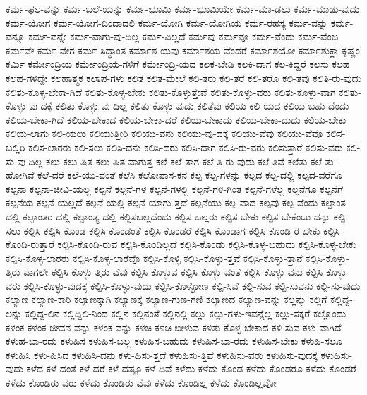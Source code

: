 {ಕರ್ಮ-ಫಲ-ವನ್ನು
ಕರ್ಮ-ಬಲೆ-ಯನ್ನು
ಕರ್ಮ-ಭೂಮಿ
ಕರ್ಮ-ಭೂಮಿಯೇ
ಕರ್ಮ-ಮಾ-ಡಲು
ಕರ್ಮ-ಮಾಡು-ವುದು
ಕರ್ಮ-ಯೋಗ
ಕರ್ಮ-ಯೋಗ-ದಿಂದಾದಲಿ
ಕರ್ಮ-ಯೋಗಿ
ಕರ್ಮ-ಯೋಗಿಯ
ಕರ್ಮ-ರಹಸ್ಯ
ಕರ್ಮ-ವನ್ನು
ಕರ್ಮ-ವನ್ನೂ
ಕರ್ಮ-ವನ್ನೇ
ಕರ್ಮ-ವಾಗು-ವು-ದಿಲ್ಲ
ಕರ್ಮ-ವಿಲ್ಲದೆ
ಕರ್ಮವು
ಕರ್ಮವೂ
ಕರ್ಮ-ವೆಂದು
ಕರ್ಮ-ವೆಂಬ
ಕರ್ಮವೇ
ಕರ್ಮ-ವೇಗ
ಕರ್ಮ-ಸಿದ್ಧಾಂತ
ಕರ್ಮಾಶ-ಯವು
ಕರ್ಮಾಶಯ-ವೆಂದರೆ
ಕರ್ಮಾಶಯೋ
ಕರ್ಮಾಶುಕ್ಲಾ-ಕೃಷ್ಣಂ
ಕರ್ಮಿ
ಕರ್ಮೇಂದ್ರಿಯ
ಕರ್ಮೇಂದ್ರಿಯ-ಗಳಿಗೆ
ಕರ್ಮೇಂದ್ರಿ-ಯದ
ಕಲಕ-ಬೇಡಿ
ಕಲಕಿ-ದಾಗ
ಕಲ-ಕಿದ್ದರೆ
ಕಲಸು
ಕಲಹ
ಕಲಹ-ಗಳಿದ್ದೇ
ಕಲಹಾತ್ಮಕ
ಕಲಾಪ-ಗಳು
ಕಲಿತ
ಕಲಿತ-ಮೇಲೆ
ಕಲಿ-ತರು
ಕಲಿ-ತರೆ
ಕಲಿ-ತರೊ
ಕಲಿ-ತವು
ಕಲಿತಿ-ರು-ವುದು
ಕಲಿತು-ಕೊಳ್ಳ-ಬೇಕಾ-ಗಿದೆ
ಕಲಿತು-ಕೊಳ್ಳ-ಬೇಕು
ಕಲಿತು-ಕೊಳ್ಳುತ್ತೇವೆ
ಕಲಿತು-ಕೊಳ್ಳು-ವರು
ಕಲಿತು-ಕೊಳ್ಳು-ವಾಗ
ಕಲಿತು-ಕೊಳ್ಳು-ವು-ದಕ್ಕೆ
ಕಲಿತು-ಕೊಳ್ಳು-ವು-ದಿಲ್ಲ
ಕಲಿತು-ಕೊಳ್ಳು-ವುದು
ಕಲಿತೆವು
ಕಲಿಯ
ಕಲಿ-ಯದ
ಕಲಿಯ-ಬಹು-ದೆಂದು
ಕಲಿಯ-ಬೇಕಾ-ಗಿದೆ
ಕಲಿಯ-ಬೇಕಾದ
ಕಲಿಯ-ಬೇಕಾ-ದರೆ
ಕಲಿಯ-ಬೇಕಾದು
ಕಲಿಯ-ಬೇಕಾ-ದುದು
ಕಲಿಯ-ಬೇಕು
ಕಲಿಯ-ಲಾಗು
ಕಲಿ-ಯಲು
ಕಲಿಯುತ್ತೀರಿ
ಕಲಿಯು-ವನು
ಕಲಿಯು-ವು-ದಕ್ಕೆ
ಕಲಿಯು-ವೆವು
ಕಲಿಯು-ವೆವೊ
ಕಲಿಸ-ಬಲ್ಲಿರಿ
ಕಲಿಸ-ಲಾರರು
ಕಲಿ-ಸಲು
ಕಲಿಸಿ-ದನು
ಕಲಿಸಿ-ದರು
ಕಲಿಸಿ-ದಾಗ
ಕಲಿಸಿ-ರು-ವರು
ಕಲಿಸುತ್ತಾರೆ
ಕಲಿಸು-ವರು
ಕಲಿ-ಸು-ವು-ದಿಲ್ಲ
ಕಲು
ಕಲು-ಷಿತ
ಕಲು-ಷಿತ-ವಾಗುತ್ತ
ಕಲೆ
ಕಲೆ-ತಾಗ
ಕಲೆ-ತಿ-ರು-ವುದು
ಕಲೆ-ತಿವೆ
ಕಲೆತು
ಕಲೆ-ತು-ಹೋಗಿವೆ
ಕಲೆ-ದರೆ
ಕಲೆ-ಯು-ವಂತೆ
ಕಲೆಸಿ
ಕಲೋಪಾಸ-ಕನ
ಕಲ್ಪ
ಕಲ್ಪ-ಗಳನ್ನು
ಕಲ್ಪದ
ಕಲ್ಪ-ದಲ್ಲಿ
ಕಲ್ಪದ-ವರೆಗೂ
ಕಲ್ಪನಾ
ಕಲ್ಪನಾ-ಜೀವಿ-ಯಲ್ಲ
ಕಲ್ಪನೆ
ಕಲ್ಪನೆ-ಗಳ
ಕಲ್ಪನೆ-ಗಳಲ್ಲಿ
ಕಲ್ಪನೆ-ಗಳಿ-ಗಿಂತ
ಕಲ್ಪನೆ-ಗಳೆಲ್ಲ
ಕಲ್ಪನೆಗೂ
ಕಲ್ಪನೆಗೆ
ಕಲ್ಪನೆಯ
ಕಲ್ಪನೆ-ಯಲ್ಲದೆ
ಕಲ್ಪನೆ-ಯಲ್ಲಿ
ಕಲ್ಪನೆ-ಯಾಗು-ತ್ತದೆ
ಕಲ್ಪನೆಯು
ಕಲ್ಪ-ವಾದ
ಕಲ್ಪವು
ಕಲ್ಪ-ವೆಂದು
ಕಲ್ಪಾಂತ-ದಲ್ಲಿ
ಕಲ್ಪಾಂತರ-ದಲ್ಲಿ
ಕಲ್ಪಾಂತ್ಯ-ದಲ್ಲಿ
ಕಲ್ಪಿಸಬಲ್ಲದೆಂದು
ಕಲ್ಪಿಸ-ಬಲ್ಲರು
ಕಲ್ಪಿಸ-ಬೇಕು
ಕಲ್ಪಿಸ-ಬೇಕೆಂಬು-ದನ್ನು
ಕಲ್ಪಿ-ಸಲು
ಕಲ್ಪಿಸಿ
ಕಲ್ಪಿಸಿ-ಕೊಂಡ
ಕಲ್ಪಿಸಿ-ಕೊಂಡಂತೆ
ಕಲ್ಪಿಸಿ-ಕೊಂಡರೆ
ಕಲ್ಪಿಸಿ-ಕೊಂಡಾಗ
ಕಲ್ಪಿಸಿ-ಕೊಂಡಿ-ರ-ಬೇಕು
ಕಲ್ಪಿಸಿ-ಕೊಂಡಿ-ರುತ್ತಾರೆ
ಕಲ್ಪಿಸಿ-ಕೊಂಡಿ-ರುವ
ಕಲ್ಪಿಸಿ-ಕೊಂಡಿಲ್ಲದೆ
ಕಲ್ಪಿಸಿ-ಕೊಂಡು
ಕಲ್ಪಿಸಿ-ಕೊಳ್ಳ-ಬಹುದು
ಕಲ್ಪಿಸಿ-ಕೊಳ್ಳ-ಬೇಕು
ಕಲ್ಪಿಸಿ-ಕೊಳ್ಳ-ಲಾರರು
ಕಲ್ಪಿಸಿ-ಕೊಳ್ಳ-ಲಾರೆವೊ
ಕಲ್ಪಿಸಿ-ಕೊಳ್ಳಿ
ಕಲ್ಪಿಸಿ-ಕೊಳ್ಳು-ತ್ತವೆ
ಕಲ್ಪಿಸಿ-ಕೊಳ್ಳು-ತ್ತಾನೆ
ಕಲ್ಪಿಸಿ-ಕೊಳ್ಳು-ತ್ತಿರು-ವಾಗಲೇ
ಕಲ್ಪಿಸಿ-ಕೊಳ್ಳು-ತ್ತಿರು-ವೆವು
ಕಲ್ಪಿಸಿ-ಕೊಳ್ಳುವ
ಕಲ್ಪಿಸಿ-ಕೊಳ್ಳು-ವಂತೆ
ಕಲ್ಪಿಸಿ-ಕೊಳ್ಳು-ವನು
ಕಲ್ಪಿಸಿ-ಕೊಳ್ಳು-ವರು
ಕಲ್ಪಿಸಿ-ಕೊಳ್ಳು-ವುದಕ್ಕೆ
ಕಲ್ಪಿಸಿ-ಕೊಳ್ಳು-ವುದು
ಕಲ್ಪಿಸಿ-ಕೊಳ್ಳೋಣ
ಕಲ್ಪಿ-ಸಿವೆ
ಕಲ್ಪಿ-ಸುವ
ಕಲ್ಪಿ-ಸುವನು
ಕಲ್ಪಿ-ಸು-ವುದು
ಕಲ್ಯಾಣ
ಕಲ್ಯಾಣ-ಕಾರಿ
ಕಲ್ಯಾಣಕ್ಕಾಗಿ
ಕಲ್ಯಾಣಕ್ಕೆ
ಕಲ್ಯಾಣ-ಗುಣ-ಗಣಿ
ಕಲ್ಯಾಣದ
ಕಲ್ಯಾಣ-ವನ್ನು
ಕಲ್ಲನ್ನು
ಕಲ್ಲಿಗೆ
ಕಲ್ಲಿದ್ದ-ಲನ್ನು
ಕಲ್ಲಿದ್ದ-ಲಿನ
ಕಲ್ಲಿದ್ದಿಲಿ-ನಿಂದ
ಕಲ್ಲಿನ
ಕಲ್ಲಿನಂತೆ
ಕಲ್ಲಿನಲ್ಲಿ
ಕಲ್ಲು
ಕಲ್ಲು-ಗಳು-ಇವನ್ನೆಲ್ಲ
ಕಲ್ಲು-ಸಕ್ಕರೆ
ಕಲ್ಲೊಂದು
ಕಳಂಕ
ಕಳಂಕ-ಜೀವನ-ವನ್ನು
ಕಳಂಕ-ವನ್ನು
ಕಳಚಿ
ಕಳಚಿ-ಬೀಳುವ
ಕಳಿತು-ಕೊಳ್ಳ-ಬೇಕಾದ
ಕಳಿ-ಸುವ
ಕಳು-ವಾಗಿದೆ
ಕಳುಹ-ಬಾ-ರದು
ಕಳುಹಿಸ
ಕಳುಹಿಸ-ಬಲ್ಲ
ಕಳುಹಿಸ-ಬಹುದು
ಕಳುಹಿಸ-ಬಾ-ರದು
ಕಳುಹಿಸ-ಬೇಕು
ಕಳುಹಿ-ಸಲೂ
ಕಳುಹಿಸಿ
ಕಳು-ಹಿಸಿದ
ಕಳುಹಿಸಿ-ದನು
ಕಳು-ಹಿಸು-ತ್ತದೆ
ಕಳುಹಿಸು-ತ್ತಿವೆ
ಕಳುಹಿಸು-ವರು
ಕಳುಹಿಸು-ವುದಕ್ಕೆ
ಕಳುಹಿಸು-ವುದು
ಕಳೆದ
ಕಳೆ-ದಂತೆ
ಕಳೆ-ದರೆ
ಕಳೆ-ದಷ್ಟೂ
ಕಳೆ-ದಿವೆ
ಕಳೆದು
ಕಳೆದು-ಕೊಂಡ
ಕಳೆದು-ಕೊಂಡರೂ
ಕಳೆದು-ಕೊಂಡರೆ
ಕಳೆದು-ಕೊಂಡಿರು-ವರು
ಕಳೆದು-ಕೊಂಡಿರು-ವೆವು
ಕಳೆದು-ಕೊಂಡಿಲ್ಲ
ಕಳೆದು-ಕೊಂಡಿಲ್ಲವೋ
}
